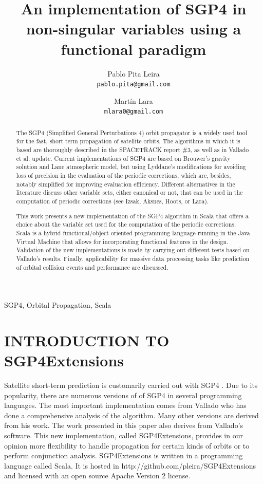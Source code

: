 \documentclass{article}
\title{An implementation of SGP4 in non-singular variables using a functional paradigm}
\author{
  Pablo Pita Leira\\
  \texttt{pablo.pita@gmail.com}
  \and
  Martín Lara\\
  \texttt{mlara0@gmail.com}
}
\begin{document}
%
\maketitle
%
\begin{abstract}
The SGP4 (Simplified General Perturbations 4) orbit propagator is a widely used tool for the fast, short term propagation of satellite orbits. The algorithms in which it is based are thoroughly described in the SPACETRACK report \#3, as well as in Vallado et al. update. Current implementations of SGP4 are based on Brouwer's gravity solution and Lane atmospheric model, but using Lyddane's modifications for avoiding loss of precision in the evaluation of the periodic corrections, which are, besides, notably simplified for improving evaluation efficiency. Different alternatives in the literature discuss other variable sets, either canonical or not, that can be used in the computation of periodic corrections (see Izsak, Aksnes, Hoots, or Lara).

This work presents a new implementation of the SGP4 algorithm in Scala that offers
a choice about the variable set used for the computation of the periodic corrections.
Scala is a hybrid functional/object oriented programming language running in the Java Virtual Machine
that allows for incorporating functional features in the design.
Validation of the new implementations is made by carrying out different tests based on Vallado's results. Finally, applicability for massive data processing tasks like prediction of orbital collision events and performance are discussed.

\end{abstract}
%
\begin{keywords}
SGP4, Orbital Propagation, Scala
\end{keywords}
%
\section{INTRODUCTION TO SGP4Extensions}
\label{sec:intro}

Satellite short-term prediction is customarily carried out
with SGP4 \cite{}. Due to its popularity, there are numerous versions of
of SGP4 in several programming languages. The most important implementation comes from Vallado
who has done a comprehensive analysis of the algorithm. Many other versions
are derived from his work. The work presented in this paper also derives from Vallado's software.
This new implementation, called SGP4Extensions, provides in our opinion more flexibility to handle
propagation for certain kinds of orbits or to perform conjunction analysis.
SGP4Extensions is written in a programming language called Scala.
It is hosted in http://github.com/pleira/SGP4Extensions and licensed
with an open source Apache Version 2 license.
\end{document}
